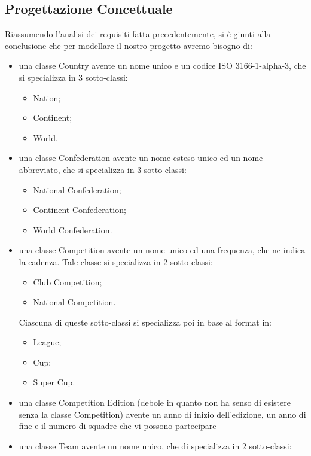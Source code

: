 \newpage
\subsection{Progettazione Concettuale}

Riassumendo l'analisi dei requisiti fatta precedentemente, si è giunti alla conclusione
che per modellare il nostro progetto avremo bisogno di:
\begin{itemize}
	\item una classe Country avente un nome unico e un codice ISO 3166-1-alpha-3,
		che si specializza in 3 sotto-classi:	
		\begin{itemize}
			\item Nation;
			\item Continent;
			\item World.
		\end{itemize}
	\item una classe Confederation avente un nome esteso unico ed un nome abbreviato,
		che si specializza in 3 sotto-classi:	
		\begin{itemize}
			\item National Confederation;
			\item Continent Confederation;
			\item World Confederation.
		\end{itemize}
	\item una classe Competition avente un nome unico ed una frequenza, che ne indica la
		cadenza. Tale classe si specializza in 2 sotto classi:	
		\begin{itemize}
			\item Club Competition;
			\item National Competition.
		\end{itemize}	
		Ciascuna di queste sotto-classi si specializza poi in base al format in:
		\begin{itemize}
			\item League;
			\item Cup;
			\item Super Cup.
		\end{itemize}
	\item una classe Competition Edition (debole in quanto non ha senso di esistere
		senza la classe Competition) avente un anno di inizio dell'edizione, un anno di fine
		e il numero di squadre che vi possono partecipare	
	\item una classe Team avente un nome unico, che di specializza in 2 sotto-classi:
		\begin{itemize}

\end{itemize}
\end{itemize}
